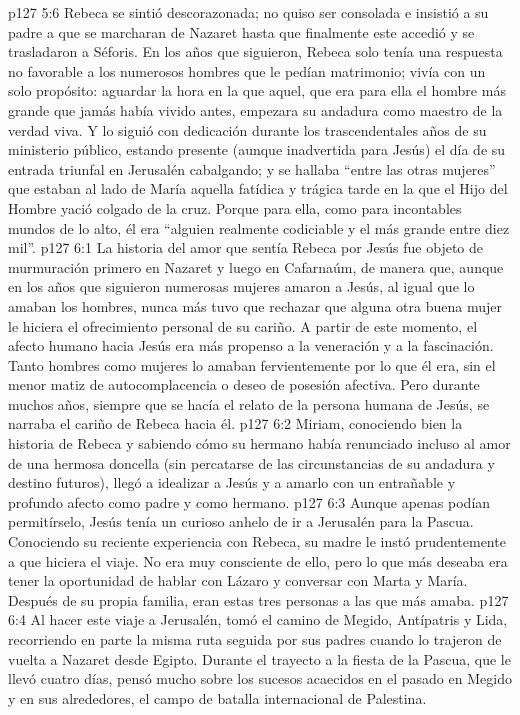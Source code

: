 \vs p127 5:6 Rebeca se sintió descorazonada; no quiso ser consolada e insistió a su padre a que se marcharan de Nazaret hasta que finalmente este accedió y se trasladaron a Séforis. En los años que siguieron, Rebeca solo tenía una respuesta no favorable a los numerosos hombres que le pedían matrimonio; vivía con un solo propósito: aguardar la hora en la que aquel, que era para ella el hombre más grande que jamás había vivido antes, empezara su andadura como maestro de la verdad viva. Y lo siguió con dedicación durante los trascendentales años de su ministerio público, estando presente (aunque inadvertida para Jesús) el día de su entrada triunfal en Jerusalén cabalgando; y se hallaba “entre las otras mujeres” que estaban al lado de María aquella fatídica y trágica tarde en la que el Hijo del Hombre yació colgado de la cruz. Porque para ella, como para incontables mundos de lo alto, él era “alguien realmente codiciable y el más grande entre diez mil”.
\vs p127 6:1 La historia del amor que sentía Rebeca por Jesús fue objeto de murmuración primero en Nazaret y luego en Cafarnaúm, de manera que, aunque en los años que siguieron numerosas mujeres amaron a Jesús, al igual que lo amaban los hombres, nunca más tuvo que rechazar que alguna otra buena mujer le hiciera el ofrecimiento personal de su cariño. A partir de este momento, el afecto humano hacia Jesús era más propenso a la veneración y a la fascinación. Tanto hombres como mujeres lo amaban fervientemente por lo que él era, sin el menor matiz de autocomplacencia o deseo de posesión afectiva. Pero durante muchos años, siempre que se hacía el relato de la persona humana de Jesús, se narraba el cariño de Rebeca hacia él.
\vs p127 6:2 Miriam, conociendo bien la historia de Rebeca y sabiendo cómo su hermano había renunciado incluso al amor de una hermosa doncella (sin percatarse de las circunstancias de su andadura y destino futuros), llegó a idealizar a Jesús y a amarlo con un entrañable y profundo afecto como padre y como hermano.
\vs p127 6:3 \pc Aunque apenas podían permitírselo, Jesús tenía un curioso anhelo de ir a Jerusalén para la Pascua. Conociendo su reciente experiencia con Rebeca, su madre le instó prudentemente a que hiciera el viaje. No era muy consciente de ello, pero lo que más deseaba era tener la oportunidad de hablar con Lázaro y conversar con Marta y María. Después de su propia familia, eran estas tres personas a las que más amaba.
\vs p127 6:4 Al hacer este viaje a Jerusalén, tomó el camino de Megido, Antípatris y Lida, recorriendo en parte la misma ruta seguida por sus padres cuando lo trajeron de vuelta a Nazaret desde Egipto. Durante el trayecto a la fiesta de la Pascua, que le llevó cuatro días, pensó mucho sobre los sucesos acaecidos en el pasado en Megido y en sus alrededores, el campo de batalla internacional de Palestina.
